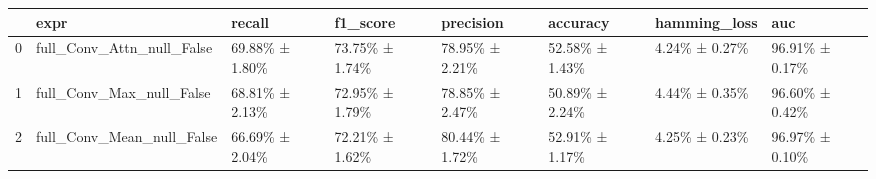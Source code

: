 \begin{tabular}{llllllll}
\toprule
 & expr & recall & f1_score & precision & accuracy & hamming_loss & auc \\
\midrule
0 & full_Conv_Attn_null_False & 69.88\% ± 1.80\% & 73.75\% ± 1.74\% & 78.95\% ± 2.21\% & 52.58\% ± 1.43\% & 4.24\% ± 0.27\% & 96.91\% ± 0.17\% \\
1 & full_Conv_Max_null_False & 68.81\% ± 2.13\% & 72.95\% ± 1.79\% & 78.85\% ± 2.47\% & 50.89\% ± 2.24\% & 4.44\% ± 0.35\% & 96.60\% ± 0.42\% \\
2 & full_Conv_Mean_null_False & 66.69\% ± 2.04\% & 72.21\% ± 1.62\% & 80.44\% ± 1.72\% & 52.91\% ± 1.17\% & 4.25\% ± 0.23\% & 96.97\% ± 0.10\% \\
\bottomrule
\end{tabular}
